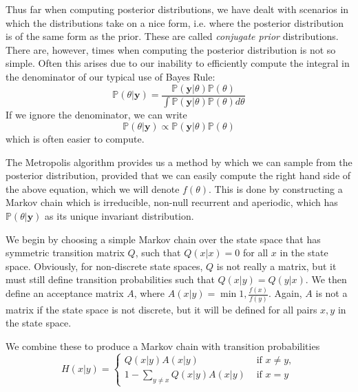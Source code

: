
Thus far when computing posterior distributions, we have dealt with scenarios in which the distributions take on a nice form, i.e. where the posterior distribution is of the same form as the prior. These are called \emph{conjugate prior} distributions. There are, however, times when computing the posterior distribution is not so simple. Often this arises due to our inability to efficiently compute the integral in the denominator of our typical use of Bayes Rule:
\begin{equation*}
\mathbb{P}(\theta | \mathbf{y}) = \frac{\mathbb{P}(\mathbf{y} | \theta) \mathbb{P}(\theta)}{\int \mathbb{P}(\mathbf{y} | \theta)\mathbb{P}(\theta) d\theta}
\end{equation*}
If we ignore the denominator, we can write 
\begin{equation*}
\mathbb{P}(\theta | \mathbf{y}) \propto \mathbb{P}(\mathbf{y} | \theta) \mathbb{P}(\theta)
\end{equation*}
which is often easier to compute.

The Metropolis algorithm provides us a method by which we can sample from the posterior distribution, provided that we can easily compute the right hand side of the above equation, which we will denote $f(\theta)$. This is done by constructing a Markov chain which is irreducible, non-null recurrent and aperiodic, which has $\mathbb{P}(\theta | \mathbf{y})$ as its unique invariant distribution.

We begin by choosing a simple Markov chain over the state space that has symmetric transition matrix $Q$, such that $Q(x | x) = 0$ for all $x$ in the state space. Obviously, for non-discrete state spaces, $Q$ is not really a matrix, but it must still define transition probabilities such that $Q(x | y) = Q(y | x)$. We then define an acceptance matrix $A$, where $A(x | y) = \min{1,\frac{f(x)}{f(y)}}$. Again, $A$ is not a matrix if the state space is not discrete, but it will be defined for all pairs $x,y$ in the state space.

We combine these to produce a Markov chain with transition probabilities
\begin{equation*}
H(x | y) = \begin{cases} Q(x | y)A(x | y) & \mbox{ if } x \neq y, \\ 1 - \sum_{y \neq x} Q(x | y)A(x | y) & \mbox{ if } x = y \end{cases}
\end{equation*}

